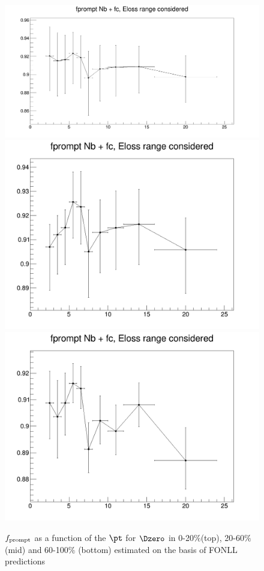 \begin{figure}
\centering
{\includegraphics[width=0.6\linewidth]{figuresVsCent/Dzero/EffAndFeed/fPrompt_Final_Nb_020.png}}
{\includegraphics[width=0.6\linewidth]{figuresVsCent/Dzero/EffAndFeed/fPrompt_Final_Nb_2060.png}}
{\includegraphics[width=0.6\linewidth]{figuresVsCent/Dzero/EffAndFeed/fPrompt_Final_Nb_60100.png}}
\caption{$f_{\rm prompt}$ as a function of the $\pt$ for $\Dzero$ in 0-20$\%$(top), 20-60$\%$ (mid) and 60-100$\%$ (bottom) estimated on the basis of FONLL predictions}
\label{fpromptDzero}
\end{figure}

